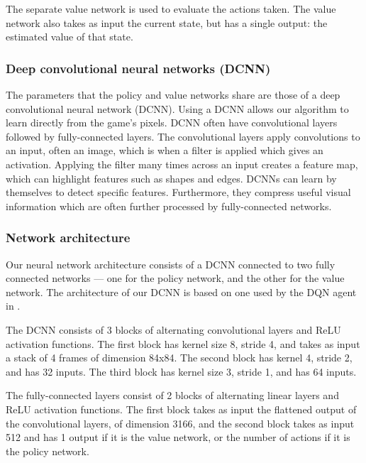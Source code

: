 \documentclass[12pt,a4paper]{article}
\begin{document}
The separate value network is used to evaluate the actions taken. The value network also takes as input the current state, but has a single output: the estimated value of that state. 

\subsubsection{Deep convolutional neural networks (DCNN)}
The parameters that the policy and value networks share are those of a deep convolutional neural network (DCNN). Using a DCNN allows our algorithm to learn directly from the game's pixels. DCNN often have convolutional layers followed by fully-connected layers. The convolutional layers apply convolutions to an input, often an image, which is when a filter is applied which gives an activation. Applying the filter many times across an input creates a feature map, which can highlight features such as shapes and edges. DCNNs can learn by themselves to detect specific features. Furthermore, they compress useful visual information which are often further processed by fully-connected networks. 

\subsubsection{Network architecture}
Our neural network architecture consists of a DCNN connected to two fully connected networks --- one for the policy network, and the other for the value network. The architecture of our DCNN is based on one used by the DQN agent in \cite{Mnih2015}.

The DCNN consists of 3 blocks of alternating convolutional layers and ReLU activation functions. The first block has kernel size 8, stride 4, and takes as input a stack of 4 frames of dimension 84x84. The second block has kernel 4, stride 2, and has 32 inputs. The third block has kernel size 3, stride 1, and has 64 inputs. 

The fully-connected layers consist of 2 blocks of alternating linear layers and ReLU activation functions. The first block takes as input the flattened output of the convolutional layers, of dimension 3166, and the second block takes as input 512 and has 1 output if it is the value network, or the number of actions if it is the policy network. 

\begin{figure}[h]
    \centering
    \hfill
    \caption{}
\end{figure}
\end{document}
